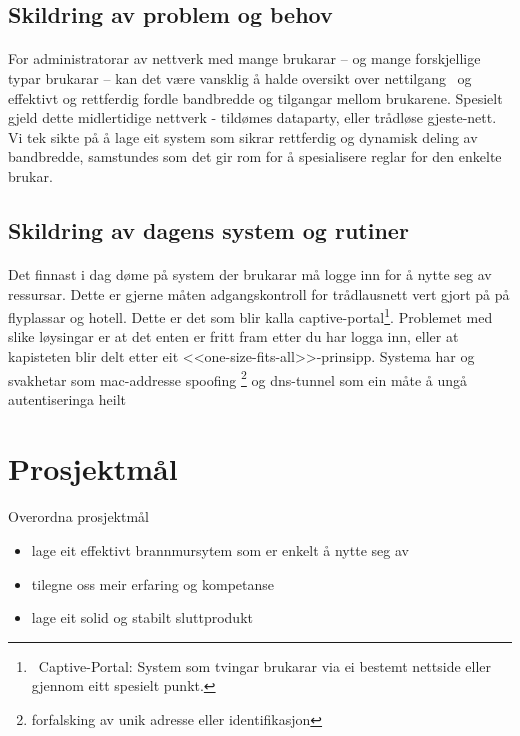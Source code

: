 \documentclass[nynorsk,12pt,a4paper]{article}
\begin{document}
\subsection{Skildring av problem og behov}
\paragraph{}
For administratorar av nettverk med mange brukarar -- og mange forskjellige typar brukarar -- kan det være vansklig å halde oversikt over nettilgang \ og effektivt og rettferdig fordle bandbredde og tilgangar mellom brukarene. Spesielt gjeld dette midlertidige nettverk - tildømes dataparty, eller trådløse gjeste-nett. Vi tek sikte på å lage eit system som sikrar rettferdig og dynamisk deling av bandbredde, samstundes som det gir rom for å spesialisere reglar for den enkelte brukar. 

\subsection{Skildring av dagens system og rutiner}
\paragraph{}
Det finnast i dag døme på system der brukarar må logge inn for å nytte seg av ressursar. Dette er gjerne måten adgangskontroll for trådlausnett vert gjort på på flyplassar og hotell. Dette er det som blir kalla captive-portal\footnote{\ Captive{}-Portal: System som tvingar brukarar via ei bestemt nettside eller gjennom eitt spesielt punkt. }. Problemet med slike løysingar er at det enten er fritt fram etter du har logga inn, eller at kapisteten blir delt etter eit <<one-size-fits-all>>-prinsipp. Systema har og svakhetar som mac-addresse spoofing \footnote{forfalsking av unik  adresse eller identifikasjon} og dns-tunnel som ein måte å ungå autentiseringa heilt

\newpage
\section{Prosjektmål}
\paragraph{}
Overordna prosjektmål
\begin{itemize}
	\item lage eit effektivt brannmursytem som er enkelt å nytte seg av
	\item tilegne oss meir erfaring og kompetanse
	\item lage eit solid og stabilt sluttprodukt
\end{itemize}
\end{document}
